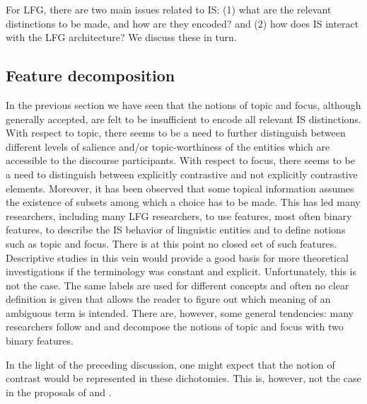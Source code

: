 \documentclass[output=paper,hidelinks]{langscibook}
\begin{document}
For LFG, there are two main issues related to IS: (1) what are the relevant distinctions to be made, and how are they encoded? and (2) how does IS interact with the LFG architecture? We discuss these in turn.

\subsection{Feature decomposition}\label{features}
In the previous section we have seen that the notions of topic and focus, although generally accepted, are felt to be insufficient to encode all relevant IS distinctions. With respect to topic, there seems to be a need to further distinguish between different levels of salience and/or topic-worthiness of the entities which are accessible to the discourse participants. With respect to focus, there seems to be a need to distinguish between explicitly contrastive and not explicitly contrastive elements. Moreover,  it has been observed that some topical information assumes the existence of subsets among which a choice has to be made. This has led many researchers, including many LFG researchers,
to use features, most often binary features, to describe the IS behavior of linguistic entities and to define notions such as topic and focus. There is at this point no closed set of such features. Descriptive studies in this vein would provide a good basis for more theoretical investigations if the terminology was constant and explicit. Unfortunately, this is not the case. The same labels are used for different concepts and often no clear definition is given that allows the reader to figure out which meaning of an ambiguous term is intended. There are, however, some general tendencies: many researchers follow \citet{Choi1996} and \citet{BK96} and decompose the notions of topic and focus with two binary features.

In the light of the preceding discussion, one might expect that the notion of contrast would be represented in these dichotomies. This is, however, not the case in the proposals of \citet{Choi1996} and \citet{BK96}. 

\end{document}
